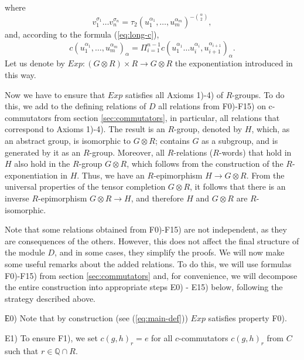 \documentclass[11pt]{article}
\theoremstyle{definition}
\begin{document}
where 
\begin{equation} \label{eq:main-def-2}
    v_1^{\sigma_1} \ldots v_n^{\sigma_n} = \tau_2(u_1^{\alpha_1}, \ldots,u_m^{\alpha_m})^{-\binom{\alpha}{2}},
\end{equation}
and, according to the formula (\ref{eq:long-c}),
\begin{equation} \label{eq:main-def-3}
    c(u_1^{\alpha_1}, \ldots,u_m^{\alpha_m})_\alpha = \Pi_{i = 1}^{n-1} c(u_1^{\alpha_1}\ldots u_i^{\alpha_i},u_{i+1}^{\alpha_{i+1}})_\alpha.
\end{equation}
Let us denote by $Exp: (G \otimes R) \times R \to G \otimes R$ the exponentiation introduced in this way.

Now we have to ensure that $Exp$ satisfies all Axioms 1)-4) of $R$-groups. To do this, we add to the defining relations of $D$ all relations from F0)-F15) on c-commutators from section \ref{sec:commutators}, in particular, all relations that correspond to Axioms 1)-4). The result is an $R$-group, denoted by $H$, which, as an abstract group, is isomorphic to $G \otimes R$; contains $G$ as a subgroup, and is generated by it as an $R$-group. Moreover, all $R$-relations ($R$-words) that hold in $H$ also hold in the $R$-group $G \otimes R$, which follows from the construction of the $R$-exponentiation in $H$. Thus, we have an $R$-epimorphism $H \to G\otimes R$. From the universal properties of the tensor completion $G \otimes R$, it follows that there is an inverse  $R$-epimorphism $G \otimes R \to H$, and therefore $H$ and $G \otimes R$ are $R$-isomorphic.

Note that some relations obtained from F0)-F15) are not independent, as they are consequences of the others. However, this does not affect the final structure of the module $D$, and in some cases, they simplify the proofs. We will now make some useful remarks about the added relations. To do this, we will use formulas F0)-F15) from section \ref{sec:commutators} and, for convenience, we will decompose the entire construction into appropriate steps E0) - E15) below, following the strategy described above.

\medskip
\noindent
Е0) Note that by construction (see (\ref{eq:main-def})) $Exp$ satisfies property F0).

\medskip
\noindent
E1) To ensure F1), we set $c(g,h)_r = e$ for all $c$-commutators $c(g,h)_r$ from $C$ such that $r \in \mathbb{Q}\cap R$.
\end{document}

